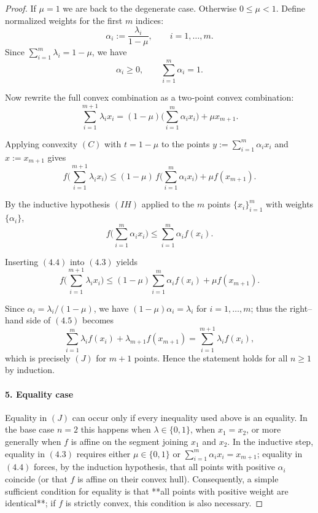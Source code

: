 \begin{proof}
If \(\mu=1\) we are back to the degenerate case.  
Otherwise \(0\le\mu<1\). Define normalized weights for the first \(m\) indices:
\[
\alpha_{i}:=\frac{\lambda_{i}}{1-\mu},\qquad i=1,\dots ,m.
\]
Since \(\sum_{i=1}^{m}\lambda_{i}=1-\mu\), we have
\[
\alpha_{i}\ge0,\qquad \sum_{i=1}^{m}\alpha_{i}=1. \tag{4.1}
\]

Now rewrite the full convex combination as a two‑point convex combination:
\[
\sum_{i=1}^{m+1}\lambda_{i}x_{i}
=(1-\mu)\Big(\sum_{i=1}^{m}\alpha_{i}x_{i}\Big)+\mu x_{m+1}. \tag{4.2}
\]

Applying convexity \((C)\) with \(t=1-\mu\) to the points
\(y:=\sum_{i=1}^{m}\alpha_{i}x_{i}\) and \(x:=x_{m+1}\) gives
\[
f\!\Big(\sum_{i=1}^{m+1}\lambda_{i}x_{i}\Big)
\le (1-\mu)\,f\!\Big(\sum_{i=1}^{m}\alpha_{i}x_{i}\Big)+\mu f(x_{m+1}). \tag{4.3}
\]

By the inductive hypothesis \((IH)\) applied to the \(m\) points \(\{x_{i}\}_{i=1}^{m}\) with
weights \(\{\alpha_{i}\}\),
\[
f\!\Big(\sum_{i=1}^{m}\alpha_{i}x_{i}\Big)
\le \sum_{i=1}^{m}\alpha_{i}f(x_{i}). \tag{4.4}
\]

Inserting \((4.4)\) into \((4.3)\) yields
\[
f\!\Big(\sum_{i=1}^{m+1}\lambda_{i}x_{i}\Big)
\le (1-\mu)\sum_{i=1}^{m}\alpha_{i}f(x_{i})+\mu f(x_{m+1}). \tag{4.5}
\]

Since \(\alpha_{i}= \lambda_{i}/(1-\mu)\), we have \((1-\mu)\alpha_{i}= \lambda_{i}\) for \(i=1,\dots ,m\); thus the right–hand side of \((4.5)\) becomes
\[
\sum_{i=1}^{m}\lambda_{i}f(x_{i})+\lambda_{m+1}f(x_{m+1})
= \sum_{i=1}^{m+1}\lambda_{i}f(x_{i}),
\]
which is precisely \((J)\) for \(m+1\) points. Hence the statement holds for all \(n\ge1\) by induction.

\paragraph{5. Equality case}  
Equality in \((J)\) can occur only if every inequality used above is an equality.
In the base case \(n=2\) this happens when \(\lambda\in\{0,1\}\), when \(x_{1}=x_{2}\), or more generally when \(f\) is affine on the segment joining \(x_{1}\) and \(x_{2}\).
In the inductive step, equality in \((4.3)\) requires either \(\mu\in\{0,1\}\) or
\(\sum_{i=1}^{m}\alpha_{i}x_{i}=x_{m+1}\); equality in \((4.4)\) forces, by the induction hypothesis, that all points with positive \(\alpha_{i}\) coincide (or that \(f\) is affine on their convex hull).
Consequently, a simple sufficient condition for equality is that **all points with positive weight are identical**; if \(f\) is strictly convex, this condition is also necessary.

\end{proof}